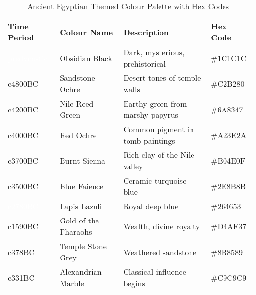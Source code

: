 \begin{table}[ht]
\centering
\renewcommand{\arraystretch}{1.2}
\begin{tabular}{l l l l}
\toprule
Time Period & Colour Name & Description & Hex Code \\
\midrule
\cellcolor[HTML]{7E6A58} \textcolor{white}{predynastic} & Obsidian Black & Dark, mysterious, prehistorical & \#1C1C1C \\
\cellcolor[HTML]{C2B280} c4800BC & Sandstone Ochre & Desert tones of temple walls & \#C2B280 \\
\cellcolor[HTML]{6A8347} c4200BC & Nile Reed Green & Earthy green from marshy papyrus & \#6A8347 \\
\cellcolor[HTML]{9f5233} c4000BC & Red Ochre & Common pigment in tomb paintings & \#A23E2A \\
\cellcolor[HTML]{B04E0F} c3700BC & Burnt Sienna & Rich clay of the Nile valley & \#B04E0F \\
\cellcolor[HTML]{8AA9C9} c3500BC & Blue Faience & Ceramic turquoise blue & \#2E8B8B \\
\cellcolor[HTML]{26619C} \textcolor{white}{c2780BC} & Lapis Lazuli & Royal deep blue & \#264653 \\
\cellcolor[HTML]{D4AF37} c1590BC & Gold of the Pharaohs & Wealth, divine royalty & \#D4AF37 \\
\cellcolor[HTML]{8B8589} c378BC & Temple Stone Grey & Weathered sandstone & \#8B8589 \\
\cellcolor[HTML]{C9C9C9} c331BC & Alexandrian Marble & Classical influence begins & \#C9C9C9 \\
\bottomrule
\end{tabular}
\caption{Ancient Egyptian Themed Colour Palette with Hex Codes}
\end{table}